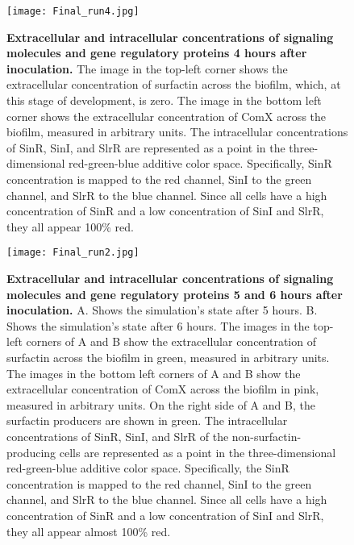 \begin{figure}[h]
    \centering
    \texttt{[image: Final\_run4.jpg]}
    \caption{\footnotesize \textbf{Extracellular and intracellular concentrations of signaling molecules and gene regulatory proteins 4 hours after inoculation.} The image in the top-left corner shows the extracellular concentration of surfactin across the biofilm, which, at this stage of development, is zero. The image in the bottom left corner shows the extracellular concentration of ComX across the biofilm, measured in arbitrary units. The intracellular concentrations of SinR, SinI, and SlrR are represented as a point in the three-dimensional red-green-blue additive color space. Specifically, SinR concentration is mapped to the red channel, SinI to the green channel, and SlrR to the blue channel. Since all cells have a high concentration of SinR and a low concentration of SinI and SlrR, they all appear 100\% red.}


\end{figure}

\begin{figure}[h]
    \centering
    \texttt{[image: Final\_run2.jpg]}
    \caption{\footnotesize \textbf{Extracellular and intracellular concentrations of signaling molecules and gene regulatory proteins 5 and 6 hours after inoculation.} A. Shows the simulation's state after 5 hours. B. Shows the simulation's state after 6 hours. The images in the top-left corners of A and B show the extracellular concentration of surfactin across the biofilm in green, measured in arbitrary units. The images in the bottom left corners of A and B show the extracellular concentration of ComX across the biofilm in pink, measured in arbitrary units. On the right side of A and B, the surfactin producers are shown in green. The intracellular concentrations of SinR, SinI, and SlrR of the non-surfactin-producing cells are represented as a point in the three-dimensional red-green-blue additive color space. Specifically, the SinR concentration is mapped to the red channel, SinI to the green channel, and SlrR to the blue channel. Since all cells have a high concentration of SinR and a low concentration of SinI and SlrR, they all appear almost 100\% red. }


\end{figure}


